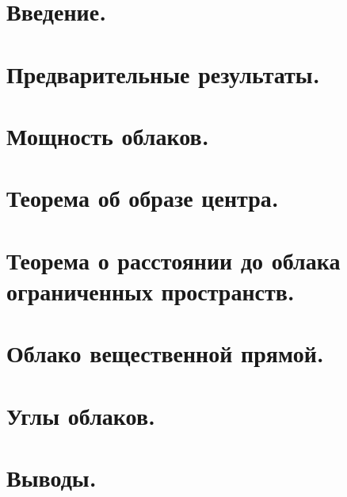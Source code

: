 \documentclass[a4paper]{article}
\begin{document}

\newpage
\tableofcontents
\newpage
\pagestyle{plain}
\setcounter{page}{1}
\section{Введение.}

\section{Предварительные результаты.}

\section{Мощность облаков.}

\section{Теорема об образе центра.}

\section{Теорема о расстоянии до облака ограниченных пространств.}

\section{Облако вещественной прямой.}

\section{Углы облаков.}

\section{Выводы.}

\newpage
\renewcommand{\emph}{\em}
\printbibliography
\end{document}
